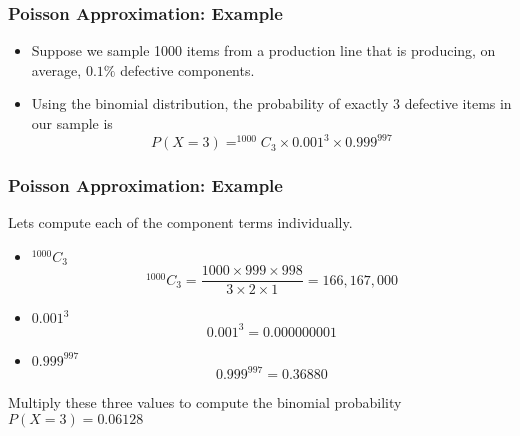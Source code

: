 \documentclass[IntroMain.tex]{subfiles}
\begin{document}
\begin{frame}
	\frametitle{Poisson Approximation: Example}
	
	\begin{itemize}
		\item Suppose we sample 1000 items from a production line that is producing, on
		average, $0.1\%$ defective components.
		\item Using the binomial distribution, the probability of exactly 3 defective items in
		our sample is
		\[P(X = 3) = ^{1000}C_{3} \times 0.001^{3} \times 0.999^{997}\]
	\end{itemize}
\end{frame}

\begin{frame}
	\frametitle{Poisson Approximation: Example}
	Lets compute each of the component terms individually.
	
	\begin{itemize}
		\item $^{1000}C_{3}$
		\[^{1000}C_{3} = \frac{1000 \times 999 \times 998}{3 \times 2 \times 1} = 166,167,000\]
		\item $0.001^3$
		\[0.001^3 = 0.000000001\]
		\item $0.999^{997}$
		\[0.999^{997} = 0.36880\]
	\end{itemize}
	
	
	Multiply these three values to compute the binomial probability
	$P(X = 3) = 0.06128$
\end{frame}
\end{document}
